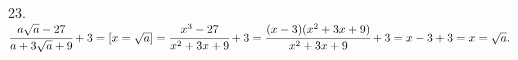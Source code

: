 23. $\cfrac{a\sqrt{a}-27}{a+3\sqrt{a}+9}+3=[x=\sqrt{a}]=\cfrac{x^3-27}{x^2+3x+9}+3=\cfrac{(x-3)(x^2+3x+9)}{x^2+3x+9}+3=x-3+3=x=\sqrt{a}.$\\
